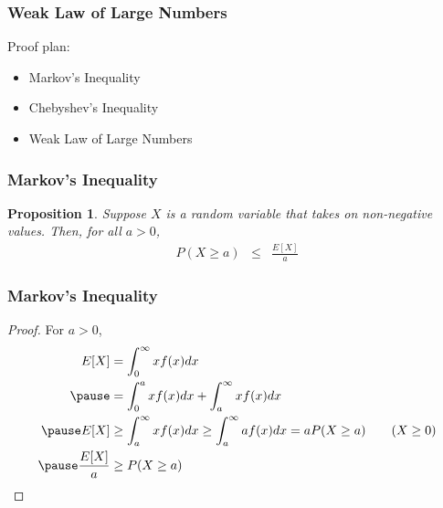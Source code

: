 \documentclass[handout, aspectratio=169]{beamer}
\newtheorem{prop}{Proposition}
\numberwithin{equation}{section}
\begin{document}
\begin{frame}
\frametitle{Weak Law of Large Numbers}

Proof plan:
\begin{itemize}
\item[-] Markov's Inequality
\item[-] Chebyshev's Inequality
\item[-] Weak Law of Large Numbers
\end{itemize}


\end{frame}


\begin{frame}
\frametitle{Markov's Inequality}

\begin{prop}
Suppose $X$ is a random variable that takes on non-negative values.  Then, for all $a>0$,
\begin{eqnarray}
P(X\geq a) & \leq & \frac{E[X]}{a} \nonumber
\end{eqnarray}
\end{prop}

\end{frame}


\begin{frame}
\frametitle{Markov's Inequality}


\begin{proof}
For $a>0$,  \pause
\begin{align*}
E[X] & =  \int_{0}^{\infty} x f(x) dx \\ \pause
& =  \int_{0}^{a} x f(x) dx + \int_{a}^{\infty} x f(x) dx \\\pause
E[X] &\geq \int_{a}^{\infty} x f(x) dx  \geq \int_{a}^{\infty} a f(x)dx = a P(X \geq a ) \tag{$X\geq0$}\\ \pause
\frac{E[X]}{a} &\geq P(X \geq a )
\end{align*}


\end{proof}

\end{frame}

\end{document}

